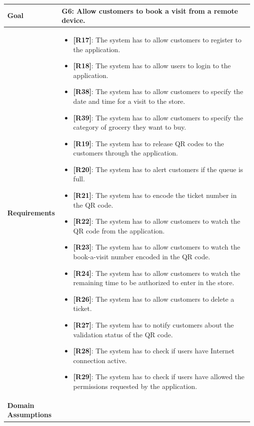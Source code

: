 \begin{table}[H]
\centering
\begin{tabular}{| m{} | m{} |} 
	\hline
	\textbf{Goal} &
		\textbf{G6: Allow customers to book a visit from a remote device.} \\
	\hline
	\textbf{Requirements} &
		\begin{itemize}
			\item {\textbf{[R17]}}: The system has to allow customers to register to the application.
			\item {\textbf{[R18]}}: The system has to allow users to login to the application.
			\item {\textbf{[R38]}}: The system has to allow customers to specify the date and time for a visit to the store.
			\item {\textbf{[R39]}}: The system has to allow customers to specify the category of grocery they want to buy.
			\item {\textbf{[R19]}}: The system has to release QR codes to the customers through the application.
			\item {\textbf{[R20]}}: The system has to alert customers if the queue is full.
			\item {\textbf{[R21]}}: The system has to encode the ticket number in the QR code.
			\item {\textbf{[R22]}}: The system has to allow customers to watch the QR code from the application.
			\item {\textbf{[R23]}}: The system has to allow customers to watch the book-a-visit number encoded in the QR code.
			\item {\textbf{[R24]}}: The system has to allow customers to watch the remaining time to be authorized to enter in the store.
			\item {\textbf{[R26]}}: The system has to allow customers to delete a ticket.
			\item {\textbf{[R27]}}: The system has to notify customers about the validation status of the QR code.
			\item {\textbf{[R28]}}: The system has to check if users have Internet connection active.
			\item {\textbf{[R29]}}: The system has to check if users have allowed the permissions requested by the application.
		\end{itemize} \\ 
	\hline
	\shortstack[l]{\textbf{Domain} \\ \textbf{Assumptions}} & 

\end{tabular}
\end{table}
